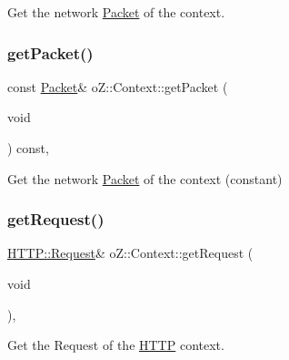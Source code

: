Get the network \mbox{\hyperlink{classo_z_1_1_packet}{Packet}} of the context. 

\mbox{\label{classo_z_1_1_context_a25918977b74de5fc3874d38a2f235ba2}} 
\subsubsection{\texorpdfstring{getPacket()}{getPacket()}\hspace{0.1cm}{\footnotesize\ttfamily [2/2]}}
{\footnotesize\ttfamily const \mbox{\hyperlink{classo_z_1_1_packet}{Packet}}\& o\+Z\+::\+Context\+::get\+Packet (\begin{DoxyParamCaption}\item[{void}]{ }\end{DoxyParamCaption}) const\hspace{0.3cm}{\ttfamily [inline]}, {\ttfamily [noexcept]}}



Get the network \mbox{\hyperlink{classo_z_1_1_packet}{Packet}} of the context (constant) 

\mbox{\label{classo_z_1_1_context_af3d2d70a75f5f637a06ec5205e78758c}} 
\subsubsection{\texorpdfstring{getRequest()}{getRequest()}\hspace{0.1cm}{\footnotesize\ttfamily [1/2]}}
{\footnotesize\ttfamily \mbox{\hyperlink{classo_z_1_1_h_t_t_p_1_1_request}{H\+T\+T\+P\+::\+Request}}\& o\+Z\+::\+Context\+::get\+Request (\begin{DoxyParamCaption}\item[{void}]{ }\end{DoxyParamCaption})\hspace{0.3cm}{\ttfamily [inline]}, {\ttfamily [noexcept]}}



Get the Request of the \mbox{\hyperlink{namespaceo_z_1_1_h_t_t_p}{H\+T\+TP}} context. 

\mbox{\label{classo_z_1_1_context_afa1b9ec6afd21b7e620e7fe1f4c14e86}} 
